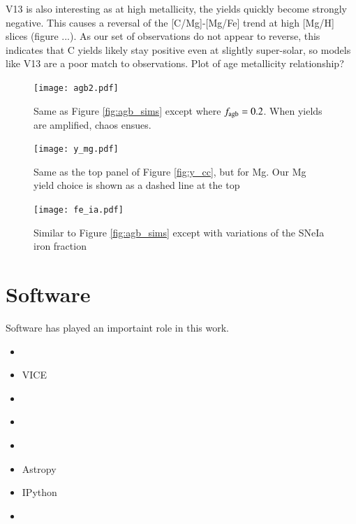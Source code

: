 \documentclass[12pt,oneside]{report}
\begin{document}
V13 is also interesting as at high metallicity, the yields quickly become strongly negative. This causes a reversal of the [C/Mg]-[Mg/Fe] trend at high [Mg/H] slices (figure ...). As our set of observations do not appear to reverse, this indicates that C yields likely stay positive even at slightly super-solar, so models like V13 are a poor match to observations. 
Plot of age metallicity relationship?


\begin{figure}[htp]
    \centering
    \texttt{[image: agb2.pdf]}

    \caption[Alternate AGB models]{Same as Figure \ref{fig:agb_sims} except where $f_{\rm agb}=0.2$. When yields are amplified, chaos ensues.}
\end{figure}


\begin{figure}
    \centering
    \texttt{[image: y\_mg.pdf]}
    \caption[Magnesium CCSNe yields]{Same as the top panel of Figure \ref{fig:y_cc}, but for Mg. Our Mg yield choice is shown as a dashed line at the top
    }
\end{figure}

\begin{figure}
    \centering
    \texttt{[image: fe\_ia.pdf]}
    \caption[Adjusting type Ia iron]{Similar to Figure \ref{fig:agb_sims} except with variations of the SNeIa iron fraction}
\end{figure}




\label{lastpage}

\section{Software}
Software has played an importaint role in this work. 
\begin{itemize}
    \item \citep{OhioSupercomputerCenter1987}
    \item VICE \citet{JW20} \citet{james+21}
    \item \cite{matplotlib}
    \item \citet{numpy}
    \item \citet{pandas}
    \item Astropy \citep{astropy:2013, astropy:2018, astropy:2022}
    \item IPython \citep{ipy}
    \item \citep{scipy}
\end{itemize}
\end{document}
